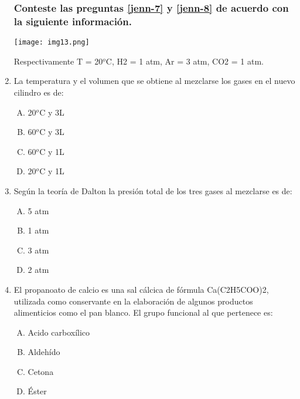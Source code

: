 \begin{enumerate}

\subsubsection*{Conteste las preguntas \ref{jenn-7} y \ref{jenn-8} de acuerdo con la siguiente información.}

 \texttt{[image: img13.png]}

Respectivamente T = 20$^o$C, H2 = 1 atm, Ar = 3 atm, CO2 = 1 atm.



\item  La temperatura y el volumen que se obtiene al mezclarse los gases en el nuevo cilindro es de:\label{jenn-7}


\begin{enumerate}[(A)]
\item 20$^o$C y 3L
\item  60$^o$C y 3L
\item  60$^o$C y 1L
\item  20$^o$C y 1L
\end{enumerate}




\item Según la teoría de Dalton la presión total de los tres gases al mezclarse es de: \label{jenn-8}


\begin{enumerate}[(A)]
\item    5 atm
\item  1 atm
\item  3 atm
\item  2 atm
\end{enumerate}




\item  El propanoato de calcio es una sal cálcica de fórmula Ca(C2H5COO)2, utilizada como conservante en la elaboración de algunos productos alimenticios como el pan blanco. El grupo funcional al que pertenece es:\label{jenn-9}


\begin{enumerate}[(A)]
\item Acido carboxílico
\item Aldehído
\item Cetona
\item Éster 
\end{enumerate}



\end{enumerate}
